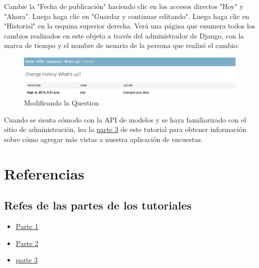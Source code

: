 \documentclass[10pt]{article}
\begin{document}
Cambie la "Fecha de publicación" haciendo clic en los accesos directos "Hoy" y "Ahora". Luego haga clic en "Guardar y continuar editando". Luego haga clic en "Historial" en la esquina superior derecha. Verá una página que enumera todos los cambios realizados en este objeto a través del administrador de Django, con la marca de tiempo y el nombre de usuario de la persona que realizó el cambio:

\begin{figure}[H]
\begin{center}
\includegraphics[scale=0.9]{figuras/325/img7.png}
\caption{Modificando la Question}
\end{center}
\end{figure}

Cuando se sienta cómodo con la API de modelos y se haya familiarizado con el sitio de administración, lea la {\href{https://docs.djangoproject.com/en/3.0/intro/tutorial03/}{\textcolor{B}{parte 3}}}  de este tutorial para obtener información sobre cómo agregar más vistas a nuestra aplicación de encuestas.

\newpage
\section{Referencias}
\subsection{Refes de las partes de los tutoriales}
\begin{itemize}
\item {\textcolor{B}{\href{https://docs.djangoproject.com/en/3.0/intro/tutorial01/}{Parte 1}}}

\item {\textcolor{B}{\href{https://docs.djangoproject.com/en/3.0/intro/tutorial02/}{Parte 2}}}

\item {\href{https://docs.djangoproject.com/en/3.0/intro/tutorial03/}{\textcolor{B}{parte 3}}}
\end{itemize}
\end{document}
